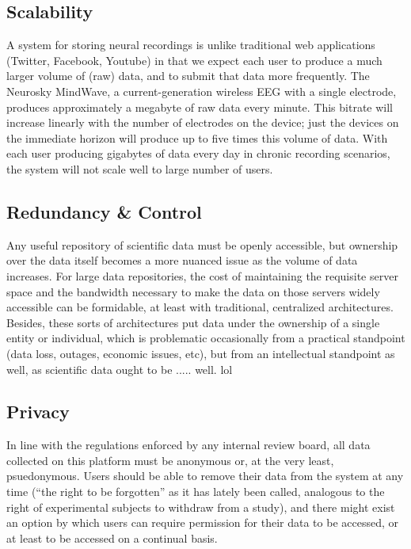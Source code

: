 \documentclass[a4paper,twoside]{article}
\begin{document}
\subsection{Scalability}

A system for storing neural recordings is unlike traditional web applications (Twitter, Facebook, Youtube) in that we expect each user to produce a much larger volume of (raw) data, and to submit that data more frequently. The Neurosky MindWave, a current-generation wireless EEG with a single electrode, produces approximately a megabyte of raw data every minute. This bitrate will increase linearly with the number of electrodes on the device; just the devices on the immediate horizon will produce up to five times this volume of data. With each user producing gigabytes of data every day in chronic recording scenarios, the system will not scale well to large number of users.

\subsection{Redundancy \& Control}

Any useful repository of scientific data must be openly accessible, but ownership over the data itself becomes a more nuanced issue as the volume of data increases. For large data repositories, the cost of maintaining the requisite server space and the bandwidth necessary to make the data on those servers widely accessible can be formidable, at least with traditional, centralized architectures. Besides, these sorts of architectures put data under the ownership of a single entity or individual, which is problematic occasionally from a practical standpoint (data loss, outages, economic issues, etc), but from an intellectual standpoint as well, as scientific data ought to be ..... well. lol

\subsection{Privacy}

In line with the regulations enforced by any internal review board, all data collected on this platform must be anonymous or, at the very least, psuedonymous. Users should be able to remove their data from the system at any time (``the right to be forgotten'' as it has lately been called, analogous to the right of experimental subjects to withdraw from a study), and there might exist an option by which users can require permission for their data to be accessed, or at least to be accessed on a continual basis.
\end{document}
